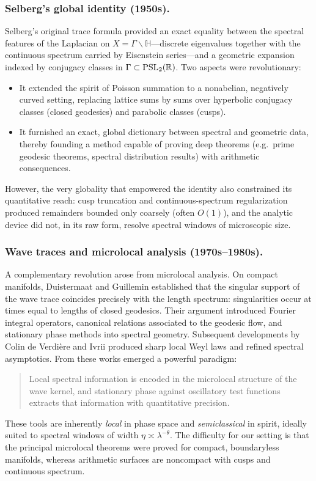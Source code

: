 \subsubsection*{Selberg’s global identity (1950s).}
Selberg’s original trace formula \cite{Selberg1956} provided an exact equality between
the spectral features of the Laplacian on $X=\Gamma\backslash\mathbb{H}$—discrete
eigenvalues together with the continuous spectrum carried by Eisenstein series—and a
geometric expansion indexed by conjugacy classes in $\Gamma\subset\operatorname{PSL}_2(\mathbb{R})$.
Two aspects were revolutionary:
\begin{itemize}
  \item It extended the spirit of Poisson summation to a nonabelian, negatively curved
  setting, replacing lattice sums by sums over hyperbolic conjugacy classes (closed
  geodesics) and parabolic classes (cusps).
  \item It furnished an exact, global dictionary between spectral and geometric data,
  thereby founding a method capable of proving deep theorems (e.g.\ prime geodesic
  theorems, spectral distribution results) with arithmetic consequences.
\end{itemize}
However, the very globality that empowered the identity also constrained its
quantitative reach: cusp truncation and continuous-spectrum regularization produced
remainders bounded only coarsely (often $O(1)$), and the analytic device did not, in
its raw form, resolve spectral windows of microscopic size.

\subsubsection*{Wave traces and microlocal analysis (1970s–1980s).}
A complementary revolution arose from microlocal analysis. On compact manifolds,
Duistermaat and Guillemin \cite{DG1975} established that the singular support of the
wave trace coincides precisely with the length spectrum: singularities occur at times
equal to lengths of closed geodesics. Their argument introduced Fourier integral
operators, canonical relations associated to the geodesic flow, and stationary phase
methods into spectral geometry. Subsequent developments by Colin de Verdière and Ivrii
\cite{Colin1978,Ivrii1980} produced sharp local Weyl laws and refined spectral
asymptotics. From these works emerged a powerful paradigm:
\begin{quote}
Local spectral information is encoded in the microlocal structure of the wave kernel,
and stationary phase against oscillatory test functions extracts that information with
quantitative precision.
\end{quote}
These tools are inherently \emph{local} in phase space and \emph{semiclassical} in
spirit, ideally suited to spectral windows of width $\eta\asymp\lambda^{-\theta}$.
The difficulty for our setting is that the principal microlocal theorems were proved
for compact, boundaryless manifolds, whereas arithmetic surfaces are noncompact with
cusps and continuous spectrum.

